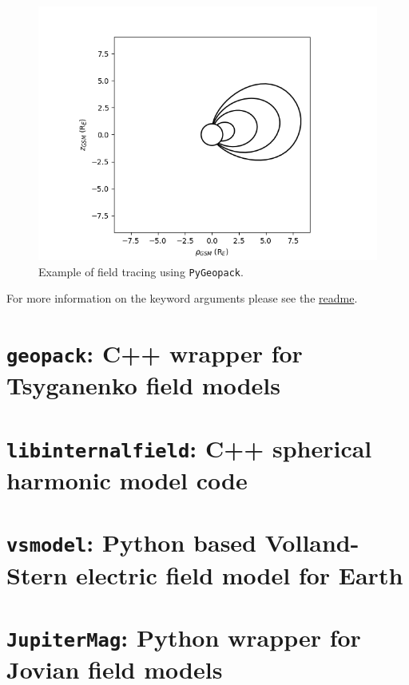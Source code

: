			\begin{figure}
				\centering\includegraphics[width=\textwidth]{figures/ch03_geopacktrace.png}
				\caption{Example of field tracing using \texttt{PyGeopack}.
					\label{figGeopackTrace}}
			\end{figure}

			For more information on the keyword arguments please see the \href{https://github.com/mattkjames7/PyGeopack/blob/master/README.md}{readme}.

	\section{\texttt{geopack}: C++ wrapper for Tsyganenko field models}

		\label{sectGeopack}

	\section{\texttt{libinternalfield}: C++ spherical harmonic model code}

	\section{\texttt{vsmodel}: Python based Volland-Stern electric field model for Earth}

	\section{\texttt{JupiterMag}: Python wrapper for Jovian field models}

